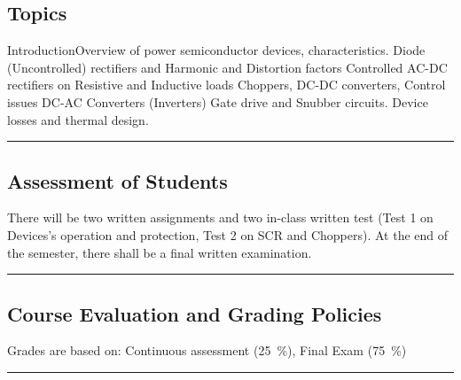 \subsection*{Topics}
\begin{outline}
    \1 Introduction\newline Overview of power semiconductor devices, characteristics.
    \1 Diode (Uncontrolled) rectifiers and Harmonic and Distortion factors
    \1 Controlled AC-DC rectifiers on Resistive and Inductive loads
    \1 Choppers, DC-DC converters, Control issues
    \1 DC-AC Converters (Inverters)
    \1 Gate drive and Snubber circuits.
    \1 Device losses and thermal design.
\end{outline}
\vspace{2ex} \hrule\vspace{2ex}

\subsection*{Assessment of Students}
There will be two written assignments and two in-class written test (Test 1 on Devices's operation and protection, Test 2 on SCR and Choppers).
At the end of the semester, there shall be a final written examination.
\vspace{2ex}\hrule\vspace{2ex}

\subsection*{Course Evaluation and Grading Policies}
Grades are based on:
Continuous assessment (\qty{25}{\percent}),
Final Exam (\qty{75}{\percent})
\vspace{2ex}\hrule\vspace{2ex}


